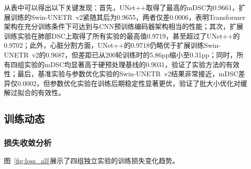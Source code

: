\documentclass[12pt, a4paper]{article}
\begin{document}
从表中可以得出以下关键发现：首先，UNet++取得了最高的mDSC为0.9661，扩展训练的Swin-UNETR~v2紧随其后为0.9655，两者仅差0.0006，表明Transformer架构在充分训练条件下可达到与CNN预训练编码器架构相当的性能；其次，扩展训练实验在肺部DSC上取得了所有实验的最高值0.9719，甚至超过了UNet++的0.9702；此外，心脏分割方面，UNet++的0.9718仍略优于扩展训练Swin-UNETR~v2的0.9687，但差距已从200轮训练时的5.86pp缩小至0.31pp；同时，所有四组实验的mDSC均显著高于硬预处理基线的0.9031，验证了实验方法的有效性；最后，基准实验与参数优化实验的Swin-UNETR~v2结果非常接近，mDSC差异仅0.0002，但参数优化实验在训练后期稳定性显著更优，验证了批大小优化对缓解过拟合的有效性。

\subsection{训练动态}
\label{sec:dynamics}

\subsubsection{损失收敛分析}

图~\ref{fig:loss_all}展示了四组独立实验的训练损失变化趋势。
\end{document}
